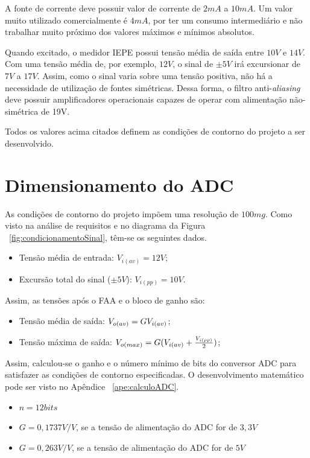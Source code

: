 \documentclass[
	12pt,				%
	openright,			%
	twoside,			%
	a4paper,			%
	english,			%
	french,				%
	spanish,			%
	brazil,				%
	]{abntex2}
\begin{document}
		A fonte de corrente deve possuir valor de corrente de $2mA$ a $10mA$. Um valor muito
		utilizado comercialmente é $4mA$, por ter um consumo intermediário e não trabalhar
		muito próximo dos valores máximos e mínimos absolutos.

		Quando excitado, o medidor IEPE possui tensão média de saída entre $10V$ e $14V$. Com uma tensão média de, por exemplo, $12V$, o sinal de $\pm 5V$ irá excursionar de $7V$ a $17V$. Assim, como o sinal varia sobre uma tensão positiva, não há a necessidade de utilização de fontes simétricas. Dessa forma, o filtro
		anti-\textit{aliasing} deve possuir amplificadores operacionais	capazes de operar com alimentação não-simétrica de 19V.
		
		Todos os valores acima citados definem as condições de contorno do
		projeto a ser desenvolvido.	

	\section{Dimensionamento do ADC}
		
		As condições de contorno do projeto impõem uma resolução de $100mg$. Como
		visto na análise de requisitos e no diagrama da Figura ~\ref{fig:condicionamentoSinal},
		têm-se os seguintes dados.
		\begin{itemize}
			
			\item Tensão média de entrada: $V_{i(av)} = 12V$;
			\item Excursão total do sinal ($\pm5V$): $V_{i(pp)} = 10V$.
			
		\end{itemize}
		Assim, as tensões após o FAA e o bloco de ganho são:

		\begin{itemize}	
			\item Tensão média de saída: $V_{o(av)} = G\* V_{i(av)}$;
			\item Tensão máxima de saída: $V_{o(max)} = G\* (V_{i(av)} + \frac{V_{i(pp)}}{2})$;
		\end{itemize}	
			
		Assim, calculou-se o ganho e o número mínimo de bits do conversor ADC para satisfazer as condições de contorno especificadas. O desenvolvimento matemático pode ser visto no Apêndice ~\ref{ape:calculoADC}.

		\begin{itemize}	
			\item $n = 12 bits$
			\item $G = 0,1737 V/V$, se a tensão de alimentação do ADC for de $3,3V$
			\item $G = 0,263 V/V$, se a tensão de alimentação do ADC for de $5V$
		\end{itemize}	
\end{document}
